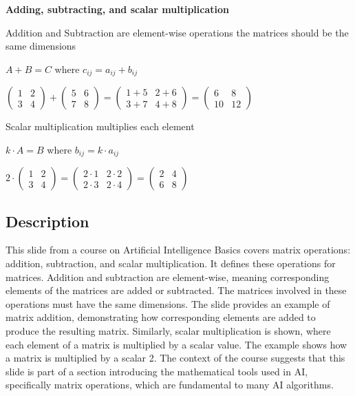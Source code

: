 \documentclass{article}%
\begin{document}
\textbf{Adding, subtracting, and scalar multiplication}

Addition and Subtraction are element-wise operations
the matrices should be the same dimensions

$A + B = C$ where $c_{ij} = a_{ij} + b_{ij}$

$\begin{pmatrix}
1 & 2 \\
3 & 4
\end{pmatrix} + \begin{pmatrix}
5 & 6 \\
7 & 8
\end{pmatrix} = \begin{pmatrix}
1 + 5 & 2 + 6 \\
3 + 7 & 4 + 8
\end{pmatrix} = \begin{pmatrix}
6 & 8 \\
10 & 12
\end{pmatrix}$

Scalar multiplication multiplies each element

$k \cdot A = B$ where $b_{ij} = k \cdot a_{ij}$

$2 \cdot \begin{pmatrix}
1 & 2 \\
3 & 4
\end{pmatrix} = \begin{pmatrix}
2 \cdot 1 & 2 \cdot 2 \\
2 \cdot 3 & 2 \cdot 4
\end{pmatrix} = \begin{pmatrix}
2 & 4 \\
6 & 8
\end{pmatrix}$
%
\subsection{Description}%
This slide from a course on Artificial Intelligence Basics covers matrix operations: addition, subtraction, and scalar multiplication.  It defines these operations for matrices.  Addition and subtraction are element-wise, meaning corresponding elements of the matrices are added or subtracted.  The matrices involved in these operations must have the same dimensions.  The slide provides an example of matrix addition, demonstrating how corresponding elements are added to produce the resulting matrix.  Similarly, scalar multiplication is shown, where each element of a matrix is multiplied by a scalar value.  The example shows how a matrix is multiplied by a scalar 2.  The context of the course suggests that this slide is part of a section introducing the mathematical tools used in AI, specifically matrix operations, which are fundamental to many AI algorithms.%
\end{document}
